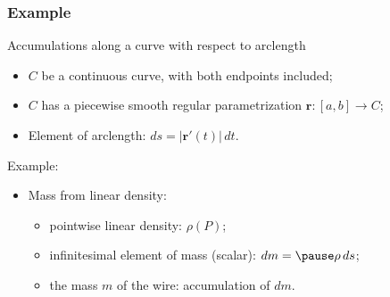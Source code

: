 \begin{frame}
  \frametitle{Example}
  Accumulations along a curve \textcolor[rgb]{0.98,0.00,0.00}{with respect to arclength}

  \begin{itemize}
    \item $C$ be a continuous curve, with both endpoints included;
    \item $C$ has a piecewise smooth regular parametrization $\textbf{r}\colon [a,b]\to C$;
    \item Element of arclength: $ds= |\textbf{r}'(t)|\, dt$.
  \end{itemize}

\pause   Example:
  \begin{itemize}
    \item Mass from linear density:
    \begin{itemize}
      \item \pause pointwise linear density: $\rho(P)$;
      \item \pause infinitesimal element of mass (scalar): $dm = \pause \rho\, ds$;
      \item \pause the mass $m$ of the wire: accumulation of $dm$.
    \end{itemize}
  \end{itemize}
\end{frame}